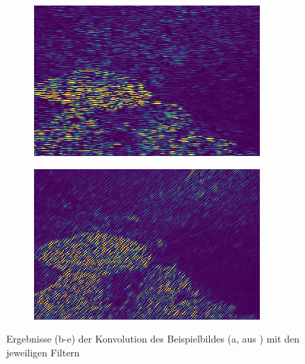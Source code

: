 \begin{figure}[H]
\begin{subfigure}[t]{0.32\textwidth}
		\subcaption{}
	\end{subfigure}
	\hfill
	\begin{subfigure}[t]{0.32\textwidth}
		\centering
		\includegraphics[width=\textwidth,keepaspectratio]{images/gen/GEN_tsugf_filterbank_101027_3.png}
		\subcaption{}
	\end{subfigure}
	\hfill
	\begin{subfigure}[t]{0.32\textwidth}
		\centering
		\includegraphics[width=\textwidth,keepaspectratio]{images/gen/GEN_tsugf_filterbank_101027_4.png}
		\subcaption{}
	\end{subfigure}
	\hfill
	\begin{subfigure}[t]{0.32\textwidth}
		\hfill
	\end{subfigure}
	\caption{Ergebnisse (b-e) der Konvolution des Beispielbildes (a, aus \cite{bsd500}) mit den jeweiligen Filtern}
	\label{fig:tsugf_101027_raw}
\end{figure}

